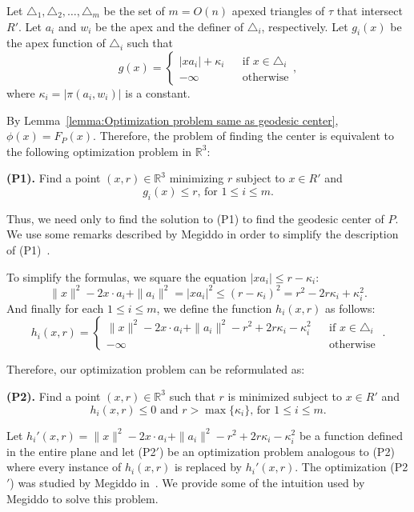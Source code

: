 \documentclass[a4paper,UKenglish]{lipics}
\newcommand{\F}[2]{\ensuremath{F_{\scriptscriptstyle #1}(#2)}}
\newcommand{\g}[2]{\ensuremath{|\pi(#1, #2)|}}
\newcommand{\reg}{\ensuremath{R'}}
\begin{document}
Let $\triangle_{1}, \triangle_{2}, \ldots, \triangle_{m}$ be the set of $m= O(n)$ apexed triangles of $\tau$ that intersect $\reg$. 
Let $a_i$ and $w_i$ be the apex and the definer of $\triangle_i$, respectively.
Let $g_i(x)$  be the apex function of $\triangle_i$ such that 
$$g(x) = \left\{ \begin{array}{lll}
|x a_i| + \kappa_i && \text{if }x\in \triangle_i\\
-\infty&&\text{otherwise}
\end{array}\right. ,$$
where $\kappa_i = \g{a_i}{w_i}$ is a constant.

By Lemma~\ref{lemma:Optimization problem same as geodesic center}, $\phi(x) = \F{P}{x}$. 
Therefore, the problem of finding the center is equivalent to the following optimization problem in $\mathbb{R}^3$:

\textbf{(P1).} Find a point $(x,r)\in \mathbb{R}^3$ minimizing $r$ subject to $x\in \reg$ and
$$\text{$g_i(x) \leq r$, for $1\leq i \leq m$}.$$

Thus, we need only to find the solution to (P1) to find the geodesic center of $P$.
We use some remarks described by Megiddo in order to simplify the description of (P1)~\cite{megiddo1989ball}.

To simplify the formulas, we square the equation $|x a_i| \leq r - \kappa_i$:
$$\|x\|^2 - 2x\cdot a_i + \|a_i\|^2  = |x a_i|^2 \leq (r - \kappa_i)^2 = r^2 - 2r\kappa_i + \kappa_i^2.$$ 
And finally for each $1\leq i\leq m$, we define the function $h_i(x, r)$ as follows:
$$h_i(x, r) = \left\{ \begin{array}{lll}
 \|x\|^2 - 2x\cdot a_i + \|a_i\|^2  - r^2 + 2r\kappa_i - \kappa_i^2 && \text{if }x\in \triangle_i\\
-\infty&&\text{otherwise}
\end{array}\right. \ .$$

Therefore, our optimization problem can be reformulated as:

\textbf{(P2).} Find a point $(x,r)\in \mathbb{R}^3$ such that $r$ is minimized subject to $x\in \reg$ and 
$$h_i(x, r) \leq 0 \text{ and  $r > \max\{\kappa_i\}$, for $1\leq i \leq m$}.$$

Let $h_i'(x,r) = \|x\|^2 - 2x\cdot a_i + \|a_i\|^2  - r^2 + 2r\kappa_i - \kappa_i^2$ be a function defined in the entire plane and let (P2$'$) be an optimization problem analogous to (P2) where every instance of $h_i(x,r)$ is replaced by $h_i'(x,r)$.
The optimization (P2$'$) was studied by Megiddo in~\cite{megiddo1989ball}. We provide some of the intuition used by Megiddo to solve this problem.
\end{document}
